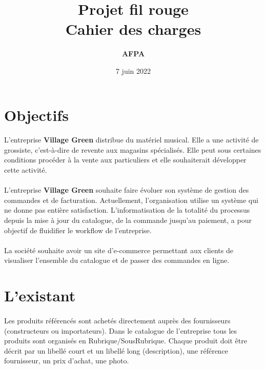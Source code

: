 \documentclass{article}
\title{\textbf{Projet fil rouge}\\Cahier des charges}
\author{\textbf{AFPA}}
\date{7 juin 2022}
\begin{document}
  \maketitle
  \newpage

\section{Objectifs}
\paragraph{}
L’entreprise \textbf{Village Green} distribue du matériel musical. Elle a une activité de grossiste, c'est-à-dire de revente aux magasins spécialisés. Elle peut sous certaines conditions procéder à la vente aux particuliers et elle souhaiterait développer cette activité.
\par
\paragraph{}
L’entreprise \textbf{Village Green} souhaite faire évoluer son système de gestion des commandes et de facturation. Actuellement, l’organisation utilise un système qui ne donne pas entière satisfaction. L’informatisation de la totalité du processus depuis la mise à jour du catalogue, de la commande jusqu’au paiement, a pour objectif de fluidifier le workflow de l’entreprise.
\par
\paragraph{}
La société souhaite avoir un site d'e-commerce permettant aux clients de visualiser l'ensemble du catalogue et de passer des commandes en ligne.
\par
\section{L’existant}
\paragraph{}
Les produits référencés sont achetés directement auprès des fournisseurs (constructeurs ou importateurs). Dans le catalogue de l'entreprise tous les produits sont organisés en Rubrique/SousRubrique. Chaque produit doit être décrit par un libellé court et un libellé long (description), une référence fournisseur, un prix d'achat, une photo.
\par
\end{document}

